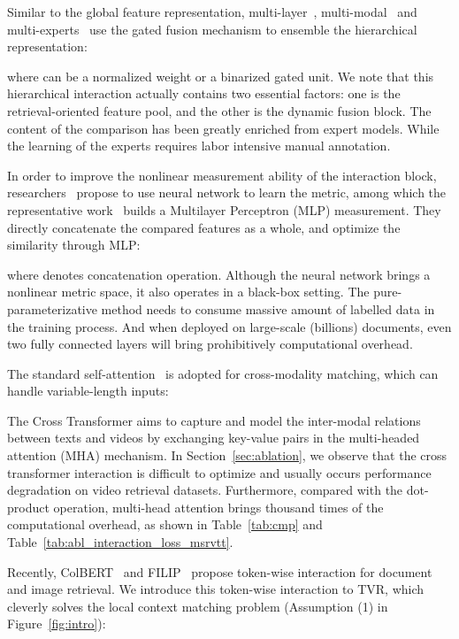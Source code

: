 \documentclass[runningheads]{llncs}
\begin{document}
Similar to the global feature representation, multi-layer~\cite{hit}, multi-modal~\cite{mmt} and multi-experts~\cite{ce} use the gated fusion mechanism to ensemble the hierarchical representation:

where  can be a normalized weight or a binarized gated unit.
We note that this hierarchical interaction actually contains two essential factors: one is the retrieval-oriented feature pool, and the other is the dynamic fusion block.
The content of the comparison has been greatly enriched from expert models. While  the learning of the experts requires labor intensive manual annotation.

In order to improve the nonlinear measurement ability of the interaction block, researchers~\cite{spm,clip4clip} propose to use neural network to learn the metric, among which the representative work~\cite{spm} builds a Multilayer Perceptron (MLP) measurement.
They directly concatenate the compared features as a whole, and optimize the similarity through MLP:

where  denotes concatenation operation. 
Although the neural network brings a nonlinear metric space, it also operates in a black-box setting. 
The pure-parameterizative method needs to consume massive amount of labelled data in the training process. 
And when deployed on large-scale (billions) documents, even two fully connected layers will bring prohibitively computational overhead.

The standard self-attention~\cite{attention} is adopted for cross-modality matching, which can handle variable-length inputs:


The Cross Transformer aims to capture and model the inter-modal relations between texts and videos by exchanging key-value pairs in the multi-headed attention (MHA) mechanism.
In Section~\ref{sec:ablation}, we observe that the cross transformer interaction is difficult to optimize and usually occurs performance degradation on video retrieval datasets.
Furthermore, compared with the dot-product operation, multi-head attention brings thousand times of the computational overhead, as shown in Table~\ref{tab:cmp} and Table~\ref{tab:abl_interaction_loss_msrvtt}.

Recently, ColBERT~\cite{colbert} and FILIP~\cite{filip} propose token-wise interaction for document and image retrieval. We introduce this token-wise interaction to TVR, which cleverly solves the local context matching problem (Assumption (1) in Figure~\ref{fig:intro}):
\end{document}
